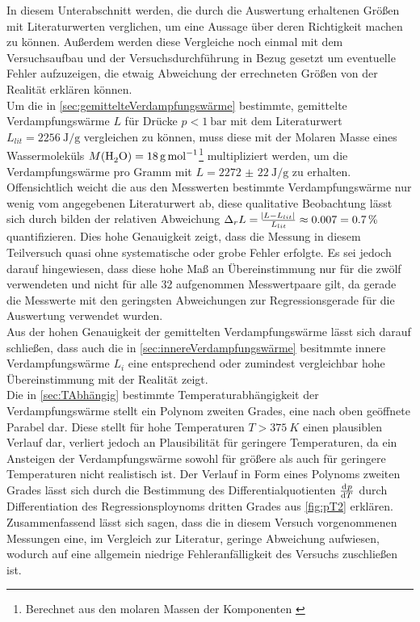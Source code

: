 In diesem Unterabschnitt werden, die durch die Auswertung erhaltenen
Größen mit Literaturwerten verglichen, um eine Aussage über deren 
Richtigkeit machen zu können. Außerdem werden diese Vergleiche noch
einmal mit dem Versuchsaufbau und der Versuchsdurchführung in Bezug
gesetzt um eventuelle Fehler aufzuzeigen, die etwaig Abweichung der 
errechneten Größen von der Realität erklären können.\\

Um die in \autoref{sec:gemittelteVerdampfungswärme} 
bestimmte, gemittelte Verdampfungswärme $L$ für Drücke 
$p < \SI{1}{\bar}$ mit dem Literaturwert $L_{lit} = 
\SI{2256}{\joule\per\g}$ \cite{Mende09}
vergleichen zu können, muss diese mit der 
Molaren Masse eines Wassermoleküls 
$M(\ce{H2O}) = \SI{18}{\g\per\mole}$\footnote{Berechnet aus den molaren Massen der Komponenten \cite{Kuchling07}} multipliziert werden, um die Verdampfungswärme pro Gramm mit 
$L =\SI{2272(22)}{\joule\per\g} $ zu erhalten.
Offensichtlich weicht die aus den Messwerten bestimmte Verdampfungswärme nur wenig vom angegebenen Literaturwert ab, diese qualitative Beobachtung lässt sich durch bilden der 
relativen Abweichung 
$ \Delta_{r} L = \tfrac{\envert{L - L_{lit}}}{L_{lit}} \approx 
\num{0.007} = \SI{0.7}{\percent}$ quantifizieren.
Dies hohe Genauigkeit zeigt, dass die Messung in diesem Teilversuch quasi
ohne systematische oder grobe Fehler erfolgte. Es sei jedoch darauf hingewiesen, dass
diese hohe Maß an Übereinstimmung nur für die zwölf verwendeten und nicht für alle 32 
aufgenommen Messwertpaare gilt, da gerade die Messwerte mit den geringsten Abweichungen 
zur Regressionsgerade für die Auswertung verwendet wurden.\\
Aus der hohen Genauigkeit der gemittelten Verdampfungswärme lässt sich darauf schließen,
dass auch die in \autoref{sec:innereVerdampfungswärme} besitmmte innere Verdampfungswärme
$L_{i}$ eine entsprechend oder zumindest vergleichbar hohe Übereinstimmung mit der Realität zeigt.\\

Die in \autoref{sec:TAbhängig} bestimmte Temperaturabhängigkeit der Verdampfungswärme
stellt ein Polynom zweiten Grades, eine nach oben geöffnete Parabel dar. 
	Diese stellt für hohe Temperaturen $ T > \SI{375}{K} $ einen plausiblen Verlauf dar,
verliert jedoch an Plausibilität für geringere Temperaturen, da ein Ansteigen der
Verdampfungswärme sowohl für größere als auch für geringere Temperaturen nicht
realistisch ist.
Der Verlauf in Form eines Polynoms zweiten Grades lässt sich durch die Bestimmung
des Differentialquotienten $\tod{p}{T}$ durch Differentiation des Regressionsploynoms 
dritten Grades aus \autoref{fig:pT2} erklären.\\


Zusammenfassend lässt sich sagen, dass die in diesem Versuch vorgenommenen Messungen 
eine, im Vergleich zur Literatur, geringe Abweichung aufwiesen, wodurch auf eine allgemein niedrige Fehleranfälligkeit des Versuchs zuschließen ist. 